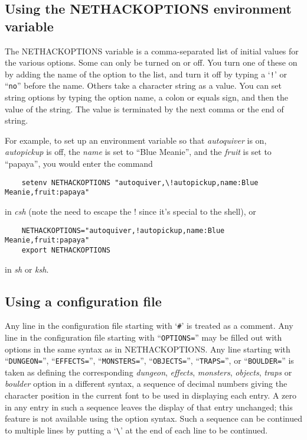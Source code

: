 \subsection*{Using the NETHACKOPTIONS environment variable}

The NETHACKOPTIONS variable is a comma-separated list of initial
values for the various options.  Some can only be turned on or off.
You turn one of these on by adding the name of the option to the list,
and turn it off by typing a `{\tt !}' or ``{\tt no}'' before the name.
Others take a
character string as a value.  You can set string options by typing
the option name, a colon or equals sign, and then the value of the string.
The value is terminated by the next comma or the end of string.

For example, to set up an environment variable so that {\it autoquiver\/}
is on, {\it autopickup\/} is off, the {\it name\/} is set to ``Blue Meanie'',
and the {\it fruit\/} is set to ``papaya'', you would enter the command
\begin{verbatim}
    setenv NETHACKOPTIONS "autoquiver,\!autopickup,name:Blue Meanie,fruit:papaya"
\end{verbatim}

\nd in {\it csh}
(note the need to escape the ! since it's special to the shell), or
\begin{verbatim}
    NETHACKOPTIONS="autoquiver,!autopickup,name:Blue Meanie,fruit:papaya"
    export NETHACKOPTIONS
\end{verbatim}

\nd in {\it sh\/} or {\it ksh}.

\subsection*{Using a configuration file}

Any line in the configuration file starting with `{\tt \#}' is treated as a comment.
Any line in the configuration file starting with ``{\tt OPTIONS=}'' may be
filled out with options in the same syntax as in NETHACKOPTIONS.
Any line starting with ``{\tt DUNGEON=}'', ``{\tt EFFECTS=}'',
``{\tt MONSTERS=}'', ``{\tt OBJECTS=}'', ``{\tt TRAPS=}'', 
or ``{\tt BOULDER=}''
is taken as defining the corresponding {\it dungeon},
{\it effects}, {\it monsters}, {\it objects}, {\it traps\/} or
{\it boulder\/} option in a different syntax,
a sequence of decimal numbers giving the character position
in the current font to be used in displaying each entry.
A zero in any entry in such a sequence leaves the display of that
entry unchanged; this feature is not available using the option syntax.
Such a sequence can be continued to multiple lines by putting a
`{\tt \verb+\+}' at the end of each line to be continued.

